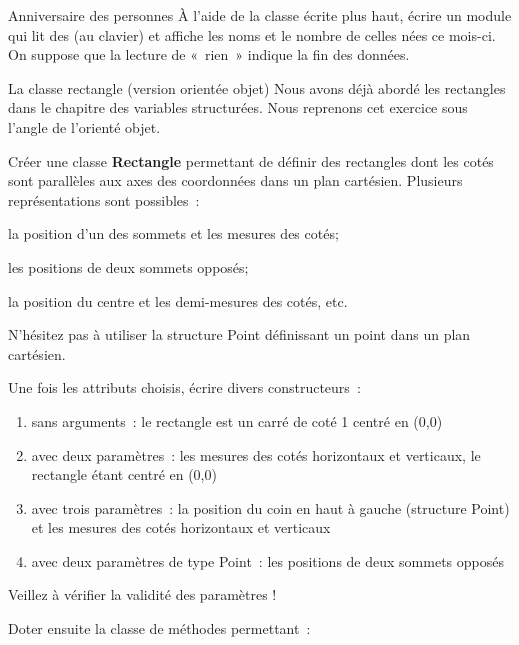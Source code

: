 \begin{Exercice}{Anniversaire des personnes}
	À l'aide de la classe  écrite plus haut,
	écrire un module qui lit des  (au clavier)
	et affiche les noms et le nombre de celles nées ce mois-ci. On suppose
	que la lecture de «~rien~» indique la fin des données.
\end{Exercice}

\begin{Exercice}{La classe rectangle (version orientée objet)}
	Nous avons déjà abordé les rectangles dans le chapitre des variables
	structurées. Nous reprenons cet exercice sous l’angle de l’orienté
	objet.

	Créer une classe \textbf{Rectangle}
	permettant de définir des rectangles dont les cotés sont parallèles aux
	axes des coordonnées dans un plan cartésien. Plusieurs représentations
	sont possibles~:

	\begin{liste}
		\item 
			la position d’un des sommets et les mesures des cotés;
		\item 
			les positions de deux sommets opposés;
		\item 
			la position du centre et les demi-mesures des cotés, etc.
	\end{liste}

	N’hésitez pas à utiliser la structure Point définissant un point dans un
	plan cartésien.

	Une fois les attributs choisis, écrire divers constructeurs~:

	\begin{enumerate}[label=\alph*)]
		\item 
			sans arguments~: le rectangle est un carré de coté 1 centré en (0,0)
		\item
			avec deux paramètres~: les mesures des cotés horizontaux et verticaux,
			le rectangle étant centré en (0,0)
		\item 
			avec trois paramètres~: la position du coin en haut à gauche (structure
			Point) et les mesures des cotés horizontaux et verticaux 
		\item 
			avec deux paramètres de type Point~: les positions de deux sommets
			opposés
	\end{enumerate}

	Veillez à vérifier la validité des paramètres !

	Doter ensuite la classe de méthodes permettant~:


\end{Exercice}
